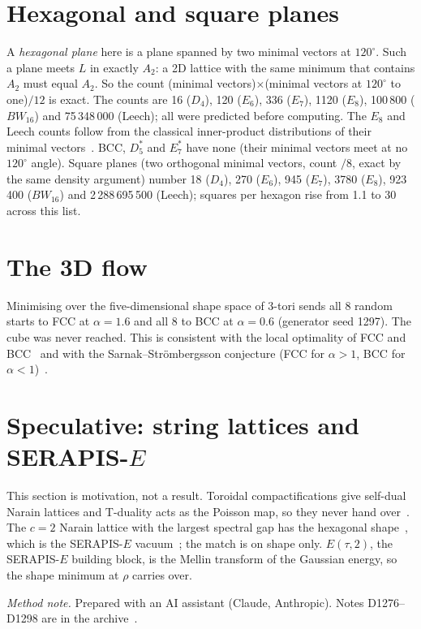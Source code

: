 \documentclass[aps,prd,twocolumn,superscriptaddress,nofootinbib,showkeys]{revtex4-2}
\begin{document}
\section{Hexagonal and square planes}
A \emph{hexagonal plane} here is a plane spanned by two minimal vectors at $120^\circ$. Such a plane meets $L$ in exactly $A_2$: a 2D lattice with the same minimum that contains $A_2$ must equal $A_2$. So the count (minimal vectors)$\times$(minimal vectors at $120^\circ$ to one)$/12$ is exact. The counts are 16 ($D_4$), 120 ($E_6$), 336 ($E_7$), 1120 ($E_8$), 100\,800 ($BW_{16}$) and 75\,348\,000 (Leech); all were predicted before computing. The $E_8$ and Leech counts follow from the classical inner-product distributions of their minimal vectors~\cite{CS}. BCC, $D_5^*$ and $E_7^*$ have none (their minimal vectors meet at no $120^\circ$ angle). Square planes (two orthogonal minimal vectors, count $/8$, exact by the same density argument) number 18 ($D_4$), 270 ($E_6$), 945 ($E_7$), 3780 ($E_8$), 923\,400 ($BW_{16}$) and 2\,288\,695\,500 (Leech); squares per hexagon rise from 1.1 to 30 across this list.

\section{The 3D flow}
Minimising over the five-dimensional shape space of 3-tori sends all 8 random starts to FCC at $\alpha=1.6$ and all 8 to BCC at $\alpha=0.6$ (generator seed 1297). The cube was never reached. This is consistent with the local optimality of FCC and BCC~\cite{Enn} and with the Sarnak--Str\"ombergsson conjecture (FCC for $\alpha>1$, BCC for $\alpha<1$)~\cite{SS,LW}.

\section{Speculative: string lattices and SERAPIS-$E$}
This section is motivation, not a result. Toroidal compactifications give self-dual Narain lattices and T-duality acts as the Poisson map, so they never hand over~\cite{P6}. The $c=2$ Narain lattice with the largest spectral gap has the hexagonal shape~\cite{ACD}, which is the SERAPIS-$E$ vacuum~\cite{SE}; the match is on shape only. $E(\tau,2)$, the SERAPIS-$E$ building block, is the Mellin transform of the Gaussian energy, so the shape minimum at $\rho$ carries over.

\emph{Method note.} Prepared with an AI assistant (Claude, Anthropic). Notes D1276--D1298 are in the archive~\cite{AEGIS}.
\end{document}
